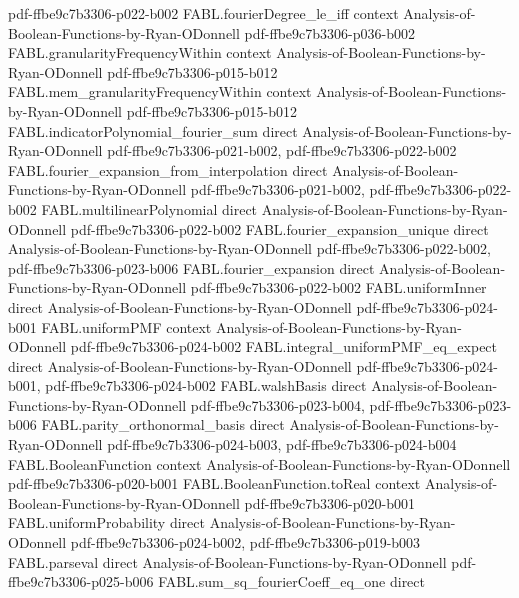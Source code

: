\begin{theorem}
  {pdf-ffbe9c7b3306-p022-b002}
\proofstep
  {FABL.fourierDegree_le_iff}
  {context}
  {Analysis-of-Boolean-Functions-by-Ryan-ODonnell}
  {pdf-ffbe9c7b3306-p036-b002}
\proofstep
  {FABL.granularityFrequencyWithin}
  {context}
  {Analysis-of-Boolean-Functions-by-Ryan-ODonnell}
  {pdf-ffbe9c7b3306-p015-b012}
\proofstep
  {FABL.mem_granularityFrequencyWithin}
  {context}
  {Analysis-of-Boolean-Functions-by-Ryan-ODonnell}
  {pdf-ffbe9c7b3306-p015-b012}
\proofstep
  {FABL.indicatorPolynomial_fourier_sum}
  {direct}
  {Analysis-of-Boolean-Functions-by-Ryan-ODonnell}
  {pdf-ffbe9c7b3306-p021-b002,
    pdf-ffbe9c7b3306-p022-b002}
\proofstep
  {FABL.fourier_expansion_from_interpolation}
  {direct}
  {Analysis-of-Boolean-Functions-by-Ryan-ODonnell}
  {pdf-ffbe9c7b3306-p021-b002,
    pdf-ffbe9c7b3306-p022-b002}
\proofstep
  {FABL.multilinearPolynomial}
  {direct}
  {Analysis-of-Boolean-Functions-by-Ryan-ODonnell}
  {pdf-ffbe9c7b3306-p022-b002}
\proofstep
  {FABL.fourier_expansion_unique}
  {direct}
  {Analysis-of-Boolean-Functions-by-Ryan-ODonnell}
  {pdf-ffbe9c7b3306-p022-b002,
    pdf-ffbe9c7b3306-p023-b006}
\proofstep
  {FABL.fourier_expansion}
  {direct}
  {Analysis-of-Boolean-Functions-by-Ryan-ODonnell}
  {pdf-ffbe9c7b3306-p022-b002}
\proofstep
  {FABL.uniformInner}
  {direct}
  {Analysis-of-Boolean-Functions-by-Ryan-ODonnell}
  {pdf-ffbe9c7b3306-p024-b001}
\proofstep
  {FABL.uniformPMF}
  {context}
  {Analysis-of-Boolean-Functions-by-Ryan-ODonnell}
  {pdf-ffbe9c7b3306-p024-b002}
\proofstep
  {FABL.integral_uniformPMF_eq_expect}
  {direct}
  {Analysis-of-Boolean-Functions-by-Ryan-ODonnell}
  {pdf-ffbe9c7b3306-p024-b001,
    pdf-ffbe9c7b3306-p024-b002}
\proofstep
  {FABL.walshBasis}
  {direct}
  {Analysis-of-Boolean-Functions-by-Ryan-ODonnell}
  {pdf-ffbe9c7b3306-p023-b004,
    pdf-ffbe9c7b3306-p023-b006}
\proofstep
  {FABL.parity_orthonormal_basis}
  {direct}
  {Analysis-of-Boolean-Functions-by-Ryan-ODonnell}
  {pdf-ffbe9c7b3306-p024-b003,
    pdf-ffbe9c7b3306-p024-b004}
\proofstep
  {FABL.BooleanFunction}
  {context}
  {Analysis-of-Boolean-Functions-by-Ryan-ODonnell}
  {pdf-ffbe9c7b3306-p020-b001}
\proofstep
  {FABL.BooleanFunction.toReal}
  {context}
  {Analysis-of-Boolean-Functions-by-Ryan-ODonnell}
  {pdf-ffbe9c7b3306-p020-b001}
\proofstep
  {FABL.uniformProbability}
  {direct}
  {Analysis-of-Boolean-Functions-by-Ryan-ODonnell}
  {pdf-ffbe9c7b3306-p024-b002,
    pdf-ffbe9c7b3306-p019-b003}
\proofstep
  {FABL.parseval}
  {direct}
  {Analysis-of-Boolean-Functions-by-Ryan-ODonnell}
  {pdf-ffbe9c7b3306-p025-b006}
\proofstep
  {FABL.sum_sq_fourierCoeff_eq_one}
  {direct}

\end{theorem}
